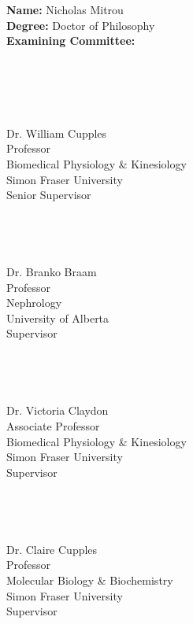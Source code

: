 

\textbf{Name:}          Nicholas Mitrou\\

\textbf{Degree:} Doctor of Philosophy\\

\textbf{Examining Committee:} \\
\\ \\ \\ \\
\makebox[2.5in]{\hrulefill} \hspace {1.0in} \\
Dr. William Cupples\\
Professor\\
Biomedical Physiology \& Kinesiology\\
Simon Fraser University\\
Senior Supervisor
\\ \\ \\ \\
\makebox[2.5in]{\hrulefill} \hspace {1.0in}\\
Dr. Branko Braam\\
Professor\\
Nephrology\\
University of Alberta\\
Supervisor
\\ \\ \\ \\
\makebox[2.5in]{\hrulefill} \hspace {1.0in}\\
Dr. Victoria Claydon\\
Associate Professor\\
Biomedical Physiology \& Kinesiology\\
Simon Fraser University\\
Supervisor
\\ \\ \\ \\
\makebox[2.5in]{\hrulefill} \hspace {1.0in}\\
Dr. Claire Cupples\\
Professor\\
Molecular Biology \& Biochemistry\\
Simon Fraser University\\
Supervisor
\\ \\ \\ \\

